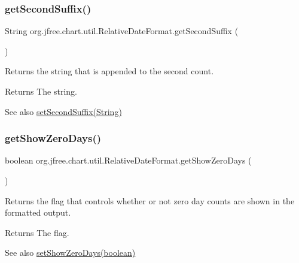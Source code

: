 \subsubsection{\texorpdfstring{get\+Second\+Suffix()}{getSecondSuffix()}}
{\footnotesize\ttfamily String org.\+jfree.\+chart.\+util.\+Relative\+Date\+Format.\+get\+Second\+Suffix (\begin{DoxyParamCaption}{ }\end{DoxyParamCaption})}

Returns the string that is appended to the second count.

\begin{DoxyReturn}{Returns}
The string.
\end{DoxyReturn}
\begin{DoxySeeAlso}{See also}
\mbox{\hyperlink{classorg_1_1jfree_1_1chart_1_1util_1_1_relative_date_format_a732eb727053796caca6b610b36f95868}{set\+Second\+Suffix(\+String)}} 
\end{DoxySeeAlso}
\mbox{\label{classorg_1_1jfree_1_1chart_1_1util_1_1_relative_date_format_a0df68eae2abaeaad6a30f11c4581ef67}} 
\subsubsection{\texorpdfstring{get\+Show\+Zero\+Days()}{getShowZeroDays()}}
{\footnotesize\ttfamily boolean org.\+jfree.\+chart.\+util.\+Relative\+Date\+Format.\+get\+Show\+Zero\+Days (\begin{DoxyParamCaption}{ }\end{DoxyParamCaption})}

Returns the flag that controls whether or not zero day counts are shown in the formatted output.

\begin{DoxyReturn}{Returns}
The flag.
\end{DoxyReturn}
\begin{DoxySeeAlso}{See also}
\mbox{\hyperlink{classorg_1_1jfree_1_1chart_1_1util_1_1_relative_date_format_a04513ebddae696114b47f23d38fcd5f6}{set\+Show\+Zero\+Days(boolean)}} 
\end{DoxySeeAlso}
\mbox{\label{classorg_1_1jfree_1_1chart_1_1util_1_1_relative_date_format_a0659489a2820c585ca1e30ea7f0f2768}} 
